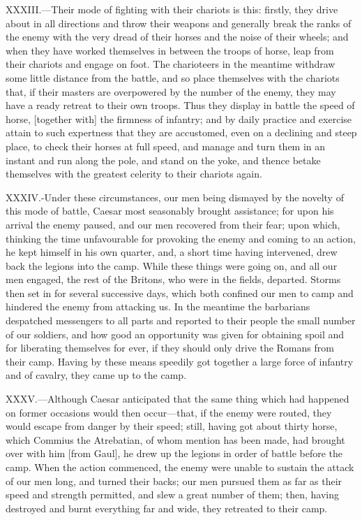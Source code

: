 XXXIII.—Their mode of fighting with their chariots is this: firstly,
they drive about in all directions and throw their weapons and generally
break the ranks of the enemy with the very dread of their horses and the
noise of their wheels; and when they have worked themselves in between
the troops of horse, leap from their chariots and engage on foot. The
charioteers in the meantime withdraw some little distance from the
battle, and so place themselves with the chariots that, if their masters
are overpowered by the number of the enemy, they may have a ready
retreat to their own troops. Thus they display in battle the speed of
horse, [together with] the firmness of infantry; and by daily practice
and exercise attain to such expertness that they are accustomed, even on
a declining and steep place, to check their horses at full speed, and
manage and turn them in an instant and run along the pole, and stand on
the yoke, and thence betake themselves with the greatest celerity to
their chariots again.

XXXIV.-Under these circumstances, our men being dismayed by the novelty
of this mode of battle, Caesar most seasonably brought assistance; for
upon his arrival the enemy paused, and our men recovered from their
fear; upon which, thinking the time unfavourable for provoking the enemy
and coming to an action, he kept himself in his own quarter, and, a
short time having intervened, drew back the legions into the camp. While
these things were going on, and all our men engaged, the rest of the
Britons, who were in the fields, departed. Storms then set in for
several successive days, which both confined our men to camp and
hindered the enemy from attacking us. In the meantime the barbarians
despatched messengers to all parts and reported to their people the
small number of our soldiers, and how good an opportunity was given for
obtaining spoil and for liberating themselves for ever, if they should
only drive the Romans from their camp. Having by these means speedily
got together a large force of infantry and of cavalry, they came up to
the camp.

XXXV.—Although Caesar anticipated that the same thing which had
happened on former occasions would then occur—that, if the enemy were
routed, they would escape from danger by their speed; still, having got
about thirty horse, which Commius the Atrebatian, of whom mention has
been made, had brought over with him [from Gaul], he drew up the legions
in order of battle before the camp. When the action commenced, the enemy
were unable to sustain the attack of our men long, and turned their
backs; our men pursued them as far as their speed and strength
permitted, and slew a great number of them; then, having destroyed and
burnt everything far and wide, they retreated to their camp.

